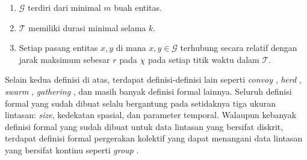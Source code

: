 \begin{enumerate}
    \item $\mathcal{G}$ terdiri dari minimal $m$ buah entitas.
    \item $\mathcal{T}$ memiliki durasi minimal selama $k$.
    \item Setiap pasang entitas $x, y$ di mana $x, y \in \mathcal{G}$ terhubung secara relatif dengan jarak maksimum sebesar $r$ pada $\chi$ pada setiap titik waktu dalam $\mathcal{T}$.
\end{enumerate}

\fi

\iffalse

\lionov{ini dua biji perlu dikasih ilustrasi sih} \cristopher{menyusul}

\fi

Selain kedua definisi di atas, terdapat definisi-definisi lain seperti \textit{convoy} \cite{jeung:convoys}, \textit{herd} \cite{huang:02:herd}, \textit{swarm} \cite{li:swarm}, \textit{gathering} \cite{zheng:02:gatherings}, dan masih banyak definisi formal lainnya. Seluruh definisi formal yang sudah dibuat selalu bergantung pada setidaknya tiga ukuran lintasan: \textit{size}, kedekatan spasial, dan parameter temporal. Walaupun kebanyak definisi formal yang sudah dibuat untuk data lintasan yang bersifat diskrit, terdapat definisi formal pergerakan kolektif yang dapat menangani data lintasan yang bersifat kontinu seperti \textit{group} \cite{buchin:group}.